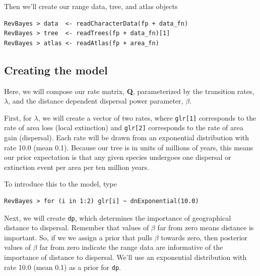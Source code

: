 \documentclass[11pt]{article}
\begin{document}
Then we'll create our range data, tree, and atlas objects

\begin{snugshade}
\begin{lstlisting}
RevBayes > data  <- readCharacterData(fp + data_fn)
RevBayes > tree  <- readTrees(fp + data_fn)[1]
RevBayes > atlas <- readAtlas(fp + area_fn)
\end{lstlisting}
\end{snugshade}

%


\subsection{Creating the model}

Here, we will compose our rate matrix, {\bf Q}, parameterized by the transition rates, $\lambda$, and the distance dependent dispersal power parameter, $\beta$.

First, for $\lambda$, we will create a vector of two rates, where {\tt glr[1]} corresponds to the rate of area loss (local extinction) and {\tt glr[2]} corresponds to the rate of area gain (dispersal).
Each rate will be drawn from an exponential distribution with rate 10.0 (mean 0.1).
Because our tree is in units of millions of years, this means our prior expectation is that any given species undergoes one dispersal or extinction event per area per ten million years.

To introduce this to the model, type
\begin{snugshade}
\begin{lstlisting}
RevBayes > for (i in 1:2) glr[i] ~ dnExponential(10.0)
\end{lstlisting}
\end{snugshade}

Next, we will create {\tt dp}, which determines the importance of geographical distance to dispersal.
Remember that values of $\beta$ far from zero means distance is important.
So, if we we assign a prior that pulls $\beta$ towards zero, then posterior values of $\beta$ far from zero indicate the range data are informative of the importance of distance to dispersal.
We'll use an exponential distribution with rate 10.0 (mean 0.1) as a prior for {\tt dp}.
\end{document}
